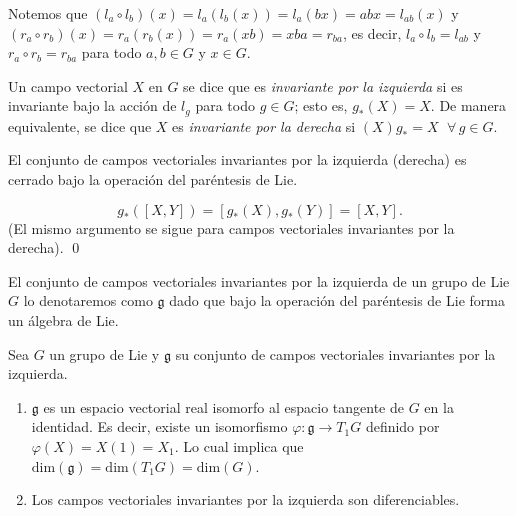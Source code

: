 \begin{obs}
Notemos que  $(l_{a} \circ l_{b}) (x) = l_{a} (l_{b} (x)) = l_{a} (bx) = abx = l_{ab} (x)$ y $(r_{a} \circ r_{b}) (x) = r_{a} (r_{b} (x)) = r_{a} (xb) = xba = r_{ba}$, es decir, $l_{a} \circ l_{b} = l_{ab}$ y $r_{a} \circ r_{b} = r_{ba}$ para todo $a, b \in G$ y $x \in G$.
\end{obs}

\begin{mydef}
Un campo vectorial $X$ en $G$ se dice que es \emph{invariante por la izquierda} si es invariante bajo la acci\'{o}n de $l_{g}$ para todo $g \in G$; esto es, $g_{*} (X) = X$. De manera equivalente, se dice que $X$ es \emph{invariante por la derecha} si $(X)g_{*} = X$ $\; \forall \, g \in G$.
\end{mydef}

\begin{thm}
El conjunto de campos vectoriales invariantes por la izquierda (derecha) es cerrado bajo la operaci\'{o}n del par\'{e}ntesis de Lie.
\end{thm}
%
\begin{dem}
$$g_{*} ([X, Y]) = [g_{*} (X), g_{*} (Y)] = [X, Y].$$ (El mismo argumento se sigue para campos vectoriales invariantes por la derecha). \qed
\end{dem}

\begin{pro}
\label{pro:LeftInvariantLieAlgebra}
El conjunto de campos vectoriales invariantes por la izquierda de un grupo de Lie $G$ lo denotaremos como $\mathfrak{g}$ dado que bajo la operaci\'{o}n del par\'{e}ntesis de Lie forma un \'{a}lgebra de Lie.
\end{pro}

\begin{pro}
Sea $G$ un grupo de Lie y $\mathfrak{g}$ su conjunto de campos vectoriales invariantes por la izquierda.
%
\begin{enumerate}
\item{$\mathfrak{g}$ es un espacio vectorial real isomorfo al espacio tangente de $G$ en la identidad. Es decir, existe un isomorfismo $\varphi: \mathfrak{g} \rightarrow T_{1} G$ definido por $\varphi(X) = X(1) = X_{1}$. Lo cual implica que $\mathrm{dim} (\mathfrak{g}) = \mathrm{dim} (T_{1} G) = \mathrm{dim} (G)$.}
\item{Los campos vectoriales invariantes por la izquierda son diferenciables.}
\end{enumerate}
%
\end{pro}

